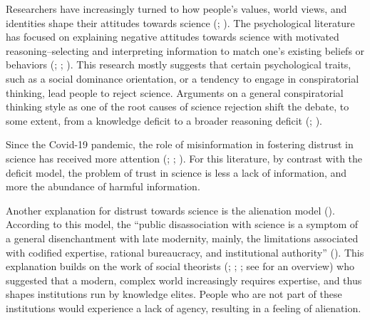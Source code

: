 \documentclass[
  man,
  floatsintext,
  longtable,
  nolmodern,
  notxfonts,
  notimes,
  colorlinks=true,linkcolor=blue,citecolor=blue,urlcolor=blue]{apa7}
\begin{document}
Researchers have increasingly turned to how people's values, world
views, and identities shape their attitudes towards science
(;
). The psychological literature has focused on
explaining negative attitudes towards science with motivated
reasoning--selecting and interpreting information to match one's
existing beliefs or behaviors
(;
;
). This research mostly suggests that certain
psychological traits, such as a social dominance orientation, or a
tendency to engage in conspiratorial thinking, lead people to reject
science. Arguments on a general conspiratorial thinking style as one of
the root causes of science rejection shift the debate, to some extent,
from a knowledge deficit to a broader reasoning deficit
(;
).

Since the Covid-19 pandemic, the role of misinformation in fostering
distrust in science has received more attention
(;
;
). For this literature, by contrast with the deficit model,
the problem of trust in science is less a lack of information, and more
the abundance of harmful information.

Another explanation for distrust towards science is the alienation model
().
According to this model, the ``public disassociation with science is a
symptom of a general disenchantment with late modernity, mainly, the
limitations associated with codified expertise, rational bureaucracy,
and institutional authority''
(). This explanation builds on the work of social theorists
(;
;
; see
 for an
overview) who suggested that a modern, complex world increasingly
requires expertise, and thus shapes institutions run by knowledge
elites. People who are not part of these institutions would experience a
lack of agency, resulting in a feeling of alienation.
\end{document}

